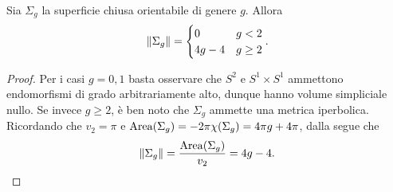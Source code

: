 \begin{corollary}
Sia $\Sigma_g$ la superficie chiusa orientabile di genere $g$. Allora
\[
\left\lVert \Sigma_g\right\rVert=
\begin{cases}
0&g<2\\
4g-4&g\ge 2
\end{cases}.
\]
\end{corollary}
\begin{proof}
Per i casi $g=0,1$ basta osservare che $S^2$ e $S^1\times S^1$ ammettono endomorfismi di grado arbitrariamente alto, dunque hanno volume simpliciale nullo. Se invece $g\ge2$, è ben noto che $\Sigma_g$ ammette una metrica iperbolica. Ricordando che $v_2=\pi$ e $\operatorname{Area}(\Sigma_g)=-2\pi\chi(\Sigma_g)=4\pi g+4\pi$, dalla  segue che
\[
\left\lVert \Sigma_g\right\rVert=\frac{\operatorname{Area}(\Sigma_g)}{v_2}=4g-4.\qedhere
\]
\end{proof}